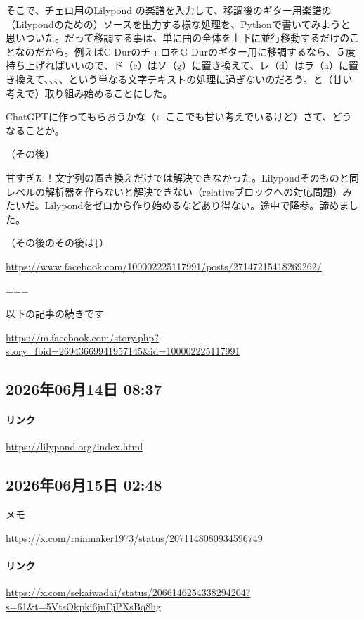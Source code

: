 \documentclass[facebook_diary.tex]{subfiles}
\begin{document}
そこで、チェロ用のLilypond の楽譜を入力して、移調後のギター用楽譜の（Lilypondのための）ソースを出力する様な処理を、Pythonで書いてみようと思いついた。だって移調する事は、単に曲の全体を上下に並行移動するだけのことなのだから。例えばC-DurのチェロをG-Durのギター用に移調するなら、５度持ち上げればいいので、ド（c）はソ（g）に置き換えて、レ（d）はラ（a）に置き換えて、、、、という単なる文字テキストの処理に過ぎないのだろう。と（甘い考えで）取り組み始めることにした。


ChatGPTに作ってもらおうかな（←ここでも甘い考えでいるけど）さて、どうなることか。


（その後）

甘すぎた！文字列の置き換えだけでは解決できなかった。Lilypondそのものと同レベルの解析器を作らないと解決できない（relativeブロックへの対応問題）みたいだ。Lilypondをゼロから作り始めるなどあり得ない。途中で降参。諦めました。


（その後のその後は↓）

\url{https://www.facebook.com/100002225117991/posts/27147215418269262/}




===

以下の記事の続きです

\url{https://m.facebook.com/story.php?story_fbid=26943669941957145&id=100002225117991}



\subsection*{2026年06月14日 08:37}

\paragraph{リンク}
\url{https://lilypond.org/index.html}

\subsection*{2026年06月15日 02:48}

メモ


\url{https://x.com/rainmaker1973/status/2071148080934596749}



\paragraph{リンク}
\url{https://x.com/sekaiwadai/status/2066146254338294204?s=61&t=5VtsOkpki6juEjPXsBq8hg}
\end{document}

